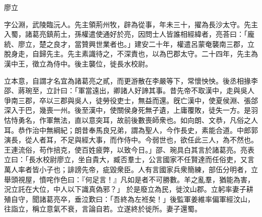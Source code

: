 \begin{pinyinscope}
 
 
 廖立
 
 
 字公淵，武陵臨沅人。先主領荊州牧，辟為從事，年未三十，擢為長沙太守。先主入蜀，諸葛亮鎮荊土，孫權遣使通好於亮，因問士人皆誰相經緯者，亮荅曰：「龐統、廖立，楚之良才，當贊興世業者也。」建安二十年，權遣呂蒙奄襲南三郡，立脫身走，自歸先主。先主素識待之，不深責也，以為巴郡太守。二十四年，先主為漢中王，徵立為侍中。後主襲位，徙長水校尉。
 
 
立本意，自謂才名宜為諸葛亮之貳，而更游散在李嚴等下，常懷怏怏。後丞相掾李邵、蔣琬至，立計曰：「軍當遠出，卿諸人好諦其事。昔先帝不取漢中，走與吳人爭南三郡，卒以三郡與吳人，徒勞役吏士，無益而還。旣亡漢中，使夏侯淵、張郃深入于巴，幾喪一州。後至漢中，使關侯身死無孑遺，上庸覆敗，徒失一方。是羽怙恃勇名，作軍無法，直以意突耳，故前後數喪師衆也。如向朗、文恭，凡俗之人耳。恭作治中無綱紀；朗昔奉馬良兄弟，謂為聖人，今作長史，素能合道。中郎郭演長，從人者耳，不足與經大事，而作侍中。今弱世也，欲任此三人，為不然也。王連流俗，苟作掊克，使百姓疲弊，以致今日。」邵、琬具白其言於諸葛亮。亮表立曰：「長水校尉廖立，坐自貴大，臧否羣士，公言國家不任賢達而任俗吏，又言萬人率者皆小子也；誹謗先帝，疵毀衆臣。人有言國家兵衆簡練，部伍分明者，立舉頭視屋，憤咤作色曰：『何足言！』凡如是者不可勝數。羊之亂羣，猶能為害，況立託在大位，中人以下識真偽邪？」
 於是廢立為民，徙汶山郡。立躬率妻子耕殖自守，聞諸葛亮卒，垂泣歎曰：「吾終為左袵矣！」後監軍姜維率偏軍經汶山，往詣立，稱立意氣不衰，言論自若。立遂終於徙所。妻子還蜀。
 
 
\end{pinyinscope}